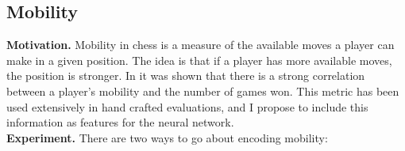 
\subsection{Mobility}

\textbf{Motivation.} Mobility in chess is a measure of the available moves a player can make in a given position. The idea is that if a player has more available moves, the position is stronger. In \cite{slater:1950} it was shown that there is a strong correlation between a player's mobility and the number of games won. This metric has been used extensively in hand crafted evaluations, and I propose to include this information as features for the neural network. \\

\textbf{Experiment.} There are two ways to go about encoding mobility:

